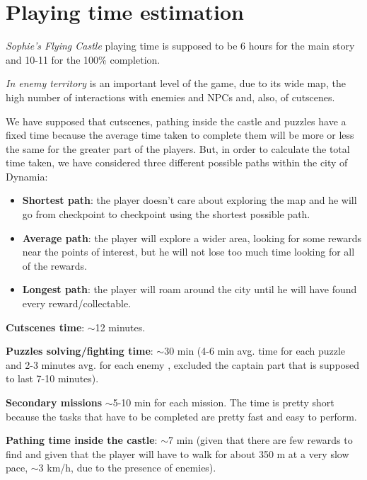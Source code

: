 \section{Playing time estimation}
\textit{Sophie's Flying Castle} playing time is supposed to be 6 hours for the main story and 10-11 for the 100\% completion.

\textit{In enemy territory} is an important level of the game, due to its wide map, the high number of interactions with enemies and NPCs and, also, of cutscenes.

We have supposed that cutscenes, pathing inside the castle and puzzles have a fixed time because the average time taken to complete them will be more or less the same for the greater part of the players. But, in order to calculate the total time taken, we have considered three different possible paths within the city of Dynamia:
\begin{itemize}
\item \textbf{Shortest path}: the player doesn't care about exploring the map and he will go from checkpoint to checkpoint using the shortest possible path.
\item \textbf{Average path}: the player will explore a wider area, looking for some rewards near the points of interest, but he will not lose too much time looking for all of the rewards.
\item \textbf{Longest path}: the player will roam around the city until he will have found every reward/collectable.
\end{itemize}
\textbf{Cutscenes time}: $\sim$12 minutes.

\textbf{Puzzles solving/fighting time}: $\sim$30 min (4-6 min avg. time for each puzzle and 2-3 minutes avg. for each enemy , excluded the captain part that is supposed to last 7-10 minutes).

\textbf{Secondary missions} $\sim$5-10 min for each mission. The time is pretty short because the tasks that have to be completed are pretty fast and  easy to perform.

\textbf{Pathing time inside the castle}: $\sim$7 min (given that there are few rewards to find and given that the player will have to walk for about 350 m at a very slow pace, $\sim$3 km/h, due to the presence of enemies).

